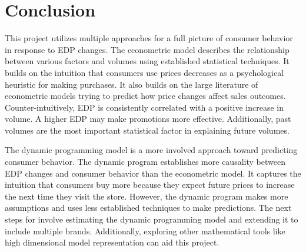 \documentclass{article}
\begin{document}
\section{Conclusion}

This project utilizes multiple approaches for a full picture of consumer behavior in response to EDP changes. The econometric model describes the relationship between various factors and volumes using established statistical techniques. It builds on the intuition that consumers use prices decreases as a psychological heuristic for making purchases. It also builds on the large literature of econometric models trying to predict how price changes affect sales outcomes.  Counter-intuitively, EDP is consistently correlated with a positive increase in volume. A higher EDP may make promotions more effective. Additionally, past volumes are the most important statistical factor in explaining future volumes.

The dynamic programming model is a more involved approach toward predicting consumer behavior.  The dynamic program establishes more causality between EDP changes and consumer behavior than the econometric model. It captures the intuition that consumers buy more because they expect future prices to increase the next time they visit the store. However, the dynamic program makes more assumptions and uses less established techniques to make predictions. The next steps for involve estimating the dynamic programming model and extending it to include multiple brands. Additionally, exploring other mathematical tools like high dimensional model representation can aid this project. 

\pagebreak

{}


\pagebreak
\end{document}
